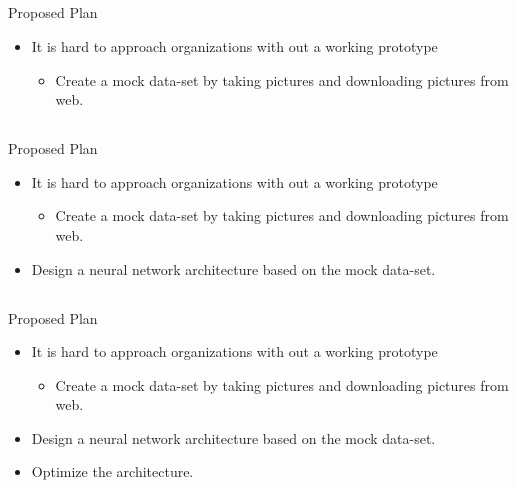\documentclass{beamer}
\begin{document}
\subsection*{}
\begin{frame}{Proposed Plan}
\begin{itemize}
\item{
It is hard to approach organizations with out a working prototype
\begin{itemize}
\item{
Create a mock data-set by taking pictures and downloading pictures from web.
}
\end{itemize}
}
\end{itemize}
\end{frame}
\subsection*{}
\begin{frame}{Proposed Plan}
\begin{itemize}
\item{
It is hard to approach organizations with out a working prototype
\begin{itemize}
\item{
Create a mock data-set by taking pictures and downloading pictures from web.
}
\end{itemize}
}
\item{
Design a neural network architecture based on the mock data-set.
}
\end{itemize}
\end{frame}
\subsection*{}
\begin{frame}{Proposed Plan}
\begin{itemize}
\item{
It is hard to approach organizations with out a working prototype
\begin{itemize}
\item{
Create a mock data-set by taking pictures and downloading pictures from web.
}
\end{itemize}
}
\item{
Design a neural network architecture based on the mock data-set.
}
\item{
Optimize the architecture.
}
\end{itemize}
\end{frame}
\end{document}
